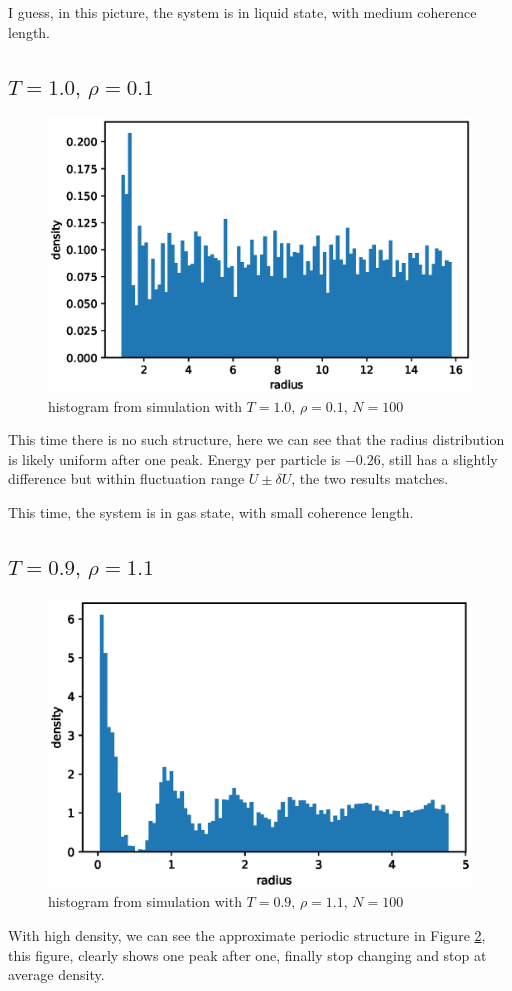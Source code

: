 \documentclass[UTF8,a4paper]{article}
\begin{document}
I guess, in this picture, the system is in liquid state, with medium coherence length.

\subsection{$T =1.0,\, \rho = 0.1$}
\begin{figure}[h]
	\centering
	\includegraphics[height=0.2\textheight]{fig/exp2_rdf_peri_1.eps}
	\caption{histogram from simulation with $T =1.0,\, \rho = 0.1, \,  N = 100$}
	\label{fig:rdf-2}
\end{figure}
This time there is no such structure, here we can see that the radius distribution is likely uniform after one peak. Energy per particle is $-0.26$, still has a slightly difference but within
fluctuation range $U\pm\delta U$, the two results matches.

This time, the system is in gas state, with small coherence length.
\subsection{$T =0.9,\, \rho = 1.1$}
\begin{figure}[h]
	\centering
	\includegraphics[height=0.2\textheight]{fig/rdf_exp3.eps}
	\caption{histogram from simulation with $T =0.9,\, \rho = 1.1, \,  N = 100$}
	\label{fig:rdf-3}
\end{figure}
With high density, we can see the approximate periodic structure in Figure \ref{fig:rdf-3}, this figure, clearly shows one peak after one, finally stop changing and stop at average density.
\end{document}
